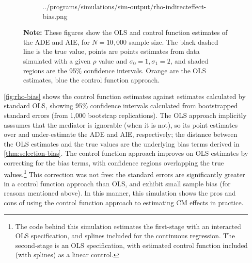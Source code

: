 \begin{figure}[h!]
\begin{subfigure}[c]{0.475\textwidth}
{            ../programs/simulations/sim-output/rho-indirecteffect-bias.png}
    \end{subfigure}
    \label{fig:rho-bias}
    \justify
    \footnotesize    
    \textbf{Note:}
    These figures show the OLS and control function estimates of the ADE and AIE, for $N = 10,000$ sample size.
    The black dashed line is the true value, points are points estimates from data simulated with a given $\rho$ value and $\sigma_0 = 1, \sigma_1 = 2$, and shaded regions are the 95\% confidence intervals.
    Orange are the OLS estimates, blue the control function approach.
\end{figure}

\autoref{fig:rho-bias} shows the control function estimates against estimates calculated by standard OLS, showing 95\% confidence intervals calculated from bootstrapped standard errors (from 1,000 bootstrap replications).
The OLS approach implicitly asssumes that the mediator is ignorable (when it is not), so its point estimates over and under-estimate the ADE and AIE, respectively; the distance between the OLS estimates and the true values are the underlying bias terms derived in \autoref{thm:selection-bias}.
The control function approach improves on OLS estimates by correcting for the bias terms, with confidence regions overlapping the true values.\footnote{
    The code behind this simulation estimates the first-stage with an interacted OLS specification, and splines included for the continuous regression.
    The second-stage is an OLS specification, with estimated control function included (with splines) as a linear control.
}
This correction was not free: the standard errors are significantly greater in a control function approach than OLS, and exhibit small sample bias (for reasons mentioned above).
In this manner, this simulation shows the pros and cons of using the control function approach to estimating CM effects in practice.
